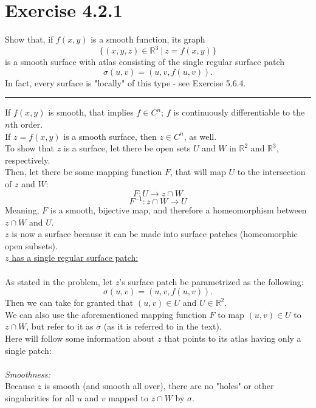 \documentclass[12pt]{article}
\begin{document}
\maketitle

\section*{Exercise 4.2.1}
Show that, if $f(x, y)$ is a smooth function, its graph
$$
\lbrace(x,y,z) \in \mathbb{R}^3 \ | \ z = f(x,y) \rbrace
$$
is a smooth surface with atlas consisting of the single regular surface patch
$$
\sigma (u,v) = (u,v,f(u,v)).
$$
In fact, every surface is "locally" of this type - see Exercise 5.6.4.

\vspace{1cm}
\hrule
\vspace{1cm}

If $f(x,y)$ is smooth, that implies $f \in C^n$; $f$ is continuously differentiable to the $n$th order.\\
If $z = f(x,y)$ is a smooth surface, then $z \in C^n$, as well.\\
\indent
To show that $z$ is a surface, let there be open sets $U$ and $W$ in $\mathbb{R}^2$ and $\mathbb{R}^3$, respectively.\\
Then, let there be some mapping function $F$, that will map $U$ to the intersection of $z$ and $W$:\\
$$
F: U \rightarrow z \cap W
$$
$$
F^{-1}: z \cap W \rightarrow U
$$
\indent
Meaning, $F$ is a smooth, bijective map, and therefore a homeomorphism between $z \cap W$ and $U$.\\
\indent
$z$ is now a surface because it can be made into surface patches (homeomorphic open subsets).\\

\noindent
\underline{$z$ has a single regular surface patch:}\\\\
As stated in the problem, let $z$'s surface patch be parametrized as the following:
$$
\sigma (u,v) = (u,v,f(u,v)).
$$
Then we can take for granted that $(u,v) \in U$ and $U \in \mathbb{R}^2$.\\
\indent
We can also use the aforementioned mapping function $F$ to map $(u,v) \in U$ to $z \cap W$, but refer to it as $\sigma$ (as it is referred to in the text).\\
\clearpage
Here will follow some information about $z$ that points to its atlas having only a single patch:\\\\
\indent
\emph{Smoothness:}\\
\indent
Because $z$ is smooth (and smooth all over), there are no "holes" or other singularities for all $u$ and $v$ mapped to $z \cap W$ by $\sigma$.\\
\end{document}
